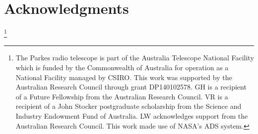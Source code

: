 \documentclass[useAMS,usenatbib]{mn2e}
\begin{document}
\section*{Acknowledgments}
\thanks{
The Parkes radio telescope is part of the Australia Telescope National 
Facility which is funded by the Commonwealth of Australia for operation as a 
National Facility managed by CSIRO. 
%
This work was supported by the Australian Research Council through grant 
DP140102578. GH is a recipient of a Future Fellowship from the Australian Research 
Council. VR is a recipient of a John Stocker postgraduate scholarship from the
Science and Industry Endowment Fund of Australia. LW acknowledges support from 
the Australian Research Council. This work made use of NASA’s ADS system.
}
%
%
%
%
%
%
%
%
%


\end{document}
